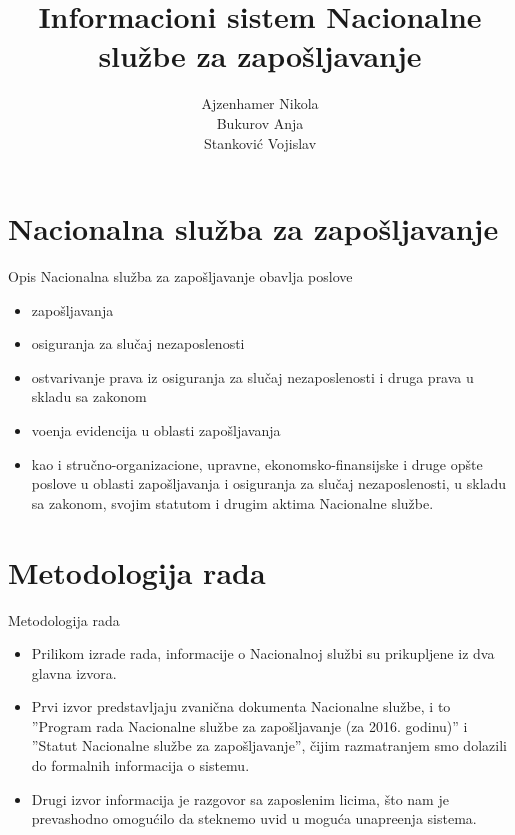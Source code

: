 \documentclass[11pt]{beamer}
\author{Ajzenhamer Nikola \\ Bukurov Anja \\ Stankovi\' c Vojislav }
\title{Informacioni sistem Nacionalne slu\v zbe za zapo\v sljavanje}
\begin{document}
	
	\begin{frame}
		\titlepage
	\end{frame}


\section{Nacionalna slu\v zba za zapo\v sljavanje}

\begin{frame}{Opis}
Nacionalna slu\v zba za zapo\v sljavanje obavlja poslove 
	\begin{itemize}
		\item zapo\v sljavanja
		\item osiguranja za slu\v caj nezaposlenosti
		\item ostvarivanje prava iz osiguranja za slu\v caj nezaposlenosti i druga prava u skladu sa zakonom
		\item vo\dj enja evidencija u oblasti zapo\v sljavanja
		\item kao i stru\v cno-organi\-zacione, upravne, ekonomsko-finansijske i druge op\v ste poslove u oblasti zapo\v sljavanja i osiguranja za slu\v caj nezaposlenosti, u skladu sa zakonom, svojim statutom i drugim aktima Nacionalne slu\v zbe.
	\end{itemize}
	
\end{frame}

\section{Metodologija rada}
\begin{frame}{Metodologija rada}
	\begin{itemize}
		\item Prilikom izrade rada, informacije o Nacionalnoj slu\v zbi su prikupljene iz dva glavna izvora.
		\item  Prvi izvor predstavljaju zvani\v cna dokumenta Nacionalne slu\v zbe, i to ''Program rada Nacionalne slu\v zbe za zapo\v sljavanje (za 2016. godinu)'' i ''Statut Nacionalne slu\v zbe za zapo\v sljavanje'', \v cijim razmatranjem smo dolazili do formalnih informacija o sistemu. 
		\item Drugi izvor informacija je razgovor sa zaposlenim licima, \v sto nam je prevashodno omogu\' cilo da steknemo uvid u mogu\' ca unapre\dj enja sistema.
	\end{itemize}
\end{frame}
\end{document}
